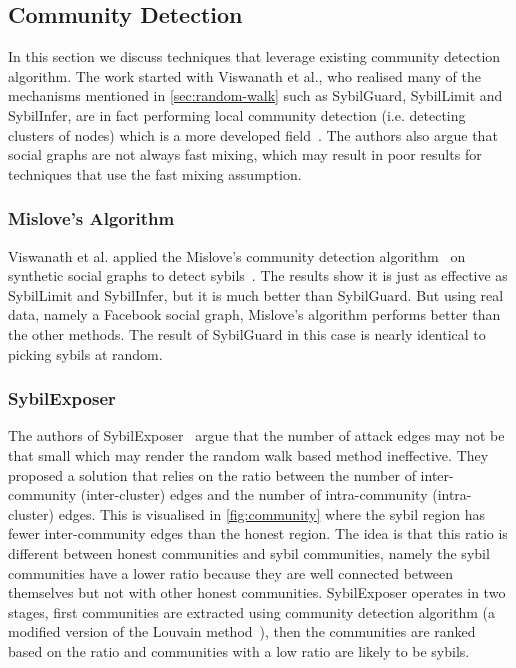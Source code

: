 
\subsection{Community Detection}\label{sec:community-detection}
In this section we discuss techniques that leverage existing community detection
algorithm. The work started with Viswanath et al., who realised many of the
mechanisms mentioned in \autoref{sec:random-walk} such as SybilGuard, SybilLimit
and SybilInfer, are in fact performing local community detection (i.e. detecting
clusters of nodes) which is a more developed field~\cite{viswanath2010analysis}.
The authors also argue that social graphs are not always fast mixing, which may
result in poor results for techniques that use the fast mixing assumption.

\subsubsection{Mislove's Algorithm}
Viswanath et al. applied the Mislove's community detection
algorithm~\cite{mislove2010you} on synthetic social graphs to detect
sybils~\cite{viswanath2010analysis}. The results show it is just as effective as
SybilLimit and SybilInfer, but it is much better than SybilGuard. But using real
data, namely a Facebook social graph, Mislove's algorithm performs better than
the other methods. The result of SybilGuard in this case is nearly identical to
picking sybils at random.

\subsubsection{SybilExposer}
The authors of SybilExposer~\cite{misra2016sybilexposer} argue that the number
of attack edges may not be that small which may render the random walk based
method ineffective. They proposed a solution that relies on the ratio between
the number of inter-community (inter-cluster) edges and the number of
intra-community (intra-cluster) edges. This is visualised in
\autoref{fig:community} where the sybil region has fewer
inter-community edges than the honest region. The idea is that this ratio is
different between honest communities and sybil communities, namely the sybil
communities have a lower ratio because they are well connected between
themselves but not with other honest communities. SybilExposer operates in two
stages, first communities are extracted using community detection algorithm (a
modified version of the Louvain method~\cite{blondel2008fast}), then the
communities are ranked based on the ratio and communities with a low ratio are
likely to be sybils.

